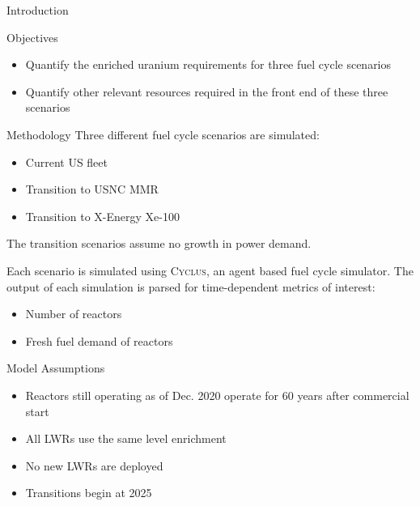 \documentclass[final]{beamer}
\newlength{\onecolwid}
\newlength{\threecolwid}
\newcommand{\Cyclus}{\textsc{Cyclus}\xspace}%
\begin{document}
\begin{frame}[t]
\begin{columns}[t,totalwidth=\threecolwid]
\begin{column}{\onecolwid}
\begin{block}{Introduction}
\end{block}

\begin{alertblock}{Objectives}
\begin{itemize}
    \item Quantify the enriched uranium requirements for three fuel cycle 
		  scenarios
	\item Quantify other relevant resources required in the front end of 
		  these three scenarios
\end{itemize}

\end{alertblock}

\begin{block}{Methodology}
Three different fuel cycle scenarios are simulated:
  \begin{itemize}
    \item Current US fleet
    \item Transition to \gls{USNC} \gls{MMR}
    \item Transition to X-Energy Xe-100
  \end{itemize}
The transition scenarios assume no growth in power demand.


Each scenario is simulated using \Cyclus \cite{huff_fundamental_2016}, an agent 
based fuel cycle simulator. The output of each simulation is parsed for time-dependent 
metrics of interest:
  \begin{itemize}
    \item Number of reactors
    \item Fresh fuel demand of reactors
  \end{itemize}

  \begin{alertblock}{Model Assumptions}
  \begin{itemize}
      \item Reactors still operating as of Dec. 2020 operate
        for 60 years after commercial start 
    \item All \gls{LWR}s use the same level enrichment
    \item No new \gls{LWR}s are deployed
    \item Transitions begin at 2025
  \end{itemize}
  

\end{alertblock}
\end{block}
\end{column}
\end{columns}
\end{frame}
\end{document}
